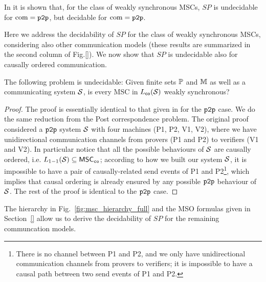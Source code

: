 In \cite{BolligFG21} it is shown that, for the class of weakly synchronous MSCs, $SP$ is undecidable for $\textup{com} = \mathtt{p2p}$, but decidable for $\textup{com} = \mathtt{p2p}$.

Here we address the decidability of $SP$ for the class of weakly synchronous MSCs, considering also other communication models (these results are summarized in the second column of Fig.\ref{}). We now show that $SP$ is undecidable also for causally ordered communication.

\begin{proposition}\label{thm:co-weak-sync}
	The following problem is undecidable:
	Given finite sets $\mathbb{P}$ and $\mathbb{M}$ as well as a communicating system $\mathcal{S}$,
	is every MSC in $L_{\mathsf{co}}(\mathcal{S})$ weakly synchronous?
\end{proposition}
\begin{proof}
	The proof is essentially identical to that given in \cite{BolligFG21} for the $\mathtt{p2p}$ case. We do the same reduction from the Post correspondence problem. The original proof considered a $\mathtt{p2p}$ system $\mathcal{S}$ with four machines (P1, P2, V1, V2), where we have unidirectional communication channels from provers (P1 and P2) to verifiers (V1 and V2). In particular notice that all the possible behaviours of $\mathcal{S}$ are causally ordered, i.e. $L_{1\mathsf{-}1}(\mathcal{S}) \subseteq \mathsf{MSC}_{\mathtt{co}}$; according to how we built our system $\mathcal{S}$, it is impossible to have a pair of causally-related send events of P1 and P2\footnote{There is no channel between P1 and P2, and we only have unidirectional communication channels from provers to verifiers; it is impossible to have a causal path between two send events of P1 and P2.}, which implies that causal ordering is already ensured by any possible $\mathtt{p2p}$ behaviour of $\mathcal{S}$. The rest of the proof is identical to the $\mathtt{p2p}$ case.
\end{proof}

The hierarchy in Fig.~\ref{fig:msc_hierarchy_full} and the MSO formulas given in Section~\ref{} allow us to derive the decidability of $SP$ for the remaining communcation models.


